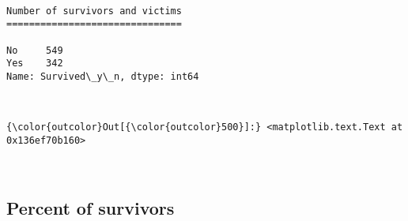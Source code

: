 \documentclass[11pt]{article}
\begin{document}
    \begin{Verbatim}[commandchars=\\\{\}]

Number of survivors and victims
===============================

No     549
Yes    342
Name: Survived\_y\_n, dtype: int64



    \end{Verbatim}

\begin{Verbatim}[commandchars=\\\{\}]
{\color{outcolor}Out[{\color{outcolor}500}]:} <matplotlib.text.Text at 0x136ef70b160>
\end{Verbatim}
            
    \begin{center}
    \end{center}
    { \hspace*{\fill} \\}
    
    \subsection{Percent of survivors}\label{percent-of-survivors}
\end{document}
